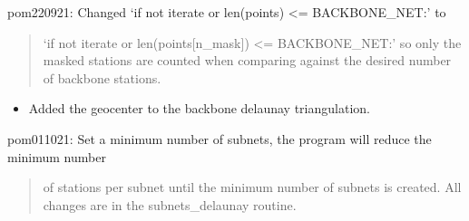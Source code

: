 \documentclass[letterpaper,10pt,english]{sphinxmanual}
\begin{document}
\sphinxAtStartPar
pom220921:
\sphinxhyphen{} Changed ‘if not iterate or len(points) \textless{}= BACKBONE\_NET:’ to
\begin{quote}

\sphinxAtStartPar
‘if not iterate or len(points{[}n\_mask{]}) \textless{}= BACKBONE\_NET:’
so only the masked stations are counted when comparing against the desired
number of backbone stations.
\end{quote}
\begin{itemize}
\item {} 
\sphinxAtStartPar
Added the geocenter to the backbone delaunay triangulation.

\end{itemize}

\sphinxAtStartPar
pom011021:
\sphinxhyphen{} Set a minimum number of subnets, the program will reduce the minimum number
\begin{quote}

\sphinxAtStartPar
of stations per subnet until the minimum number of subnets is created. All
changes are in the subnets\_delaunay routine.
\end{quote}
\end{document}
